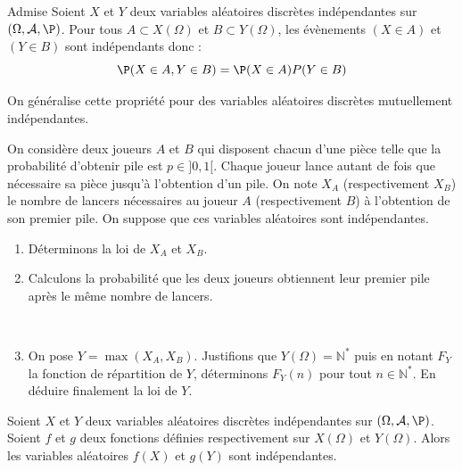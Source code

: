 \documentclass[french,11pt,twoside]{VcCours}
\begin{document}
\begin{Proposition}{Admise} Soient $X$ et $Y$ deux variables aléatoires discrètes indépendantes sur $(\Omega, \mathcal{A}, \P)$.  Pour tous $A \subset X(\Omega)$ et $B \subset Y(\Omega)$, les évènements $(X \in A)$ et $(Y \in B)$ sont indépendants donc :
$$ \P(X \in A, Y \in B) = \P(X \in A) P(Y \in B)$$
\end{Proposition}



\begin{Remarque}{} On généralise cette propriété pour des variables aléatoires discrètes mutuellement indépendantes.
\end{Remarque}

\begin{Exemple}{} On considère deux joueurs $A$ et $B$ qui disposent chacun d'une pièce telle que la probabilité d'obtenir pile est $p \in ]0,1[$. Chaque joueur lance autant de fois que nécessaire sa pièce jusqu'à l'obtention d'un pile. On note $X_A$ (respectivement $X_B$) le nombre de lancers nécessaires au joueur $A$ (respectivement $B$) à l'obtention de son premier pile. On suppose que ces variables aléatoires sont indépendantes. 
\begin{enumerate}
\item Déterminons la loi de $X_A$ et $X_B$. 

\vspace{3cm}
\item Calculons la probabilité que les deux joueurs obtiennent leur premier pile après le même nombre de lancers.

\vspace{6cm}

\newpage

$\phantom{}$

\vspace{3cm}
\item On pose $Y=\max (X_A,X_B)$. Justifions que $Y(\Omega) = \mathbb{N}^*$ puis en notant $F_Y$ la fonction de répartition de $Y$, déterminons $F_Y(n)$ pour tout $n \in \mathbb{N}^*$. En déduire finalement la loi de $Y$.

\vspace{8cm}
\end{enumerate}
\end{Exemple}


\begin{Corollaire}{} Soient $X$ et $Y$ deux variables aléatoires discrètes indépendantes sur $(\Omega, \mathcal{A}, \P)$.  Soient $f$ et $g$ deux fonctions définies respectivement sur $X(\Omega)$ et $Y(\Omega)$. Alors les variables aléatoires $f(X)$ et $g(Y)$ sont indépendantes.
\end{Corollaire}
\end{document}
